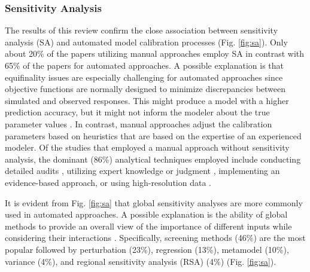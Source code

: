 \documentclass[review]{elsarticle}
\begin{document}
\subsubsection{Sensitivity Analysis}

The results of this review confirm the close association between sensitivity analysis (SA) and automated model calibration processes (Fig. \ref{fig:sa}). Only about 20\% of the papers utilizing manual approaches employ SA in contrast with 65\% of the papers for automated approaches. A possible explanation is that equifinality issues are especially challenging for automated approaches since objective functions are normally designed to minimize discrepancies between simulated and observed responses. This might produce a model with a higher prediction accuracy, but it might not inform the modeler about the true parameter values \cite{beven2006manifesto}. In contrast, manual approaches adjust the calibration parameters based on heuristics that are based on the expertise of an experienced modeler. Of the studies that employed a manual approach without sensitivity analysis, the dominant (86\%) analytical techniques employed include conducting detailed audits \cite{allesina2018calibration, mylona2017frozen, vesterberg2016calibration, guyot2020building, escandon2017assessment, ascione2015energy, monetti2015impact}, utilizing expert knowledge or judgment \cite{kazas2017energy, jermyn2016process, samuelson2016analysis, fernandez2020novel, beagon2020closing, taylor2019multi, krayem2019urban}, implementing an evidence-based approach\cite{tokarik2016life, ji2015bottom, royapoor2015building, fernandez2020novel, guyot2020building, jain2020cross, odonovan2019predicting}, or using high-resolution data \cite{tokarik2016life,ji2015bottom,royapoor2015building,fernandez2020novel,guyot2020building,odonovan2019predicting}.

It is evident from Fig. \ref{fig:sa} that global sensitivity analyses are more commonly used in automated approaches. A possible explanation is the ability of global methods to provide an overall view of the importance of different inputs while considering their interactions \cite{pianosi2016sensitivity}. Specifically, screening methods (46\%) are the most popular followed by perturbation (23\%), regression (13\%), metamodel (10\%), variance (4\%), and regional sensitivity analysis (RSA) (4\%) (Fig. \ref{fig:sa}). 
\end{document}
